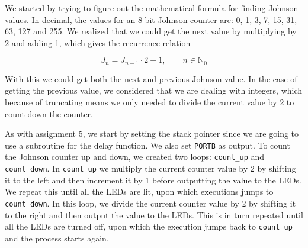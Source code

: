 We started by trying to figure out the mathematical formula for finding Johnson values. In decimal, the values for an 8-bit Johnson counter are: 0, 1, 3, 7, 15, 31, 63, 127 and 255. We realized that we could get the next value by multiplying by 2 and adding 1, which gives the recurrence relation

\begin{equation*}
    J_n = J_{n-1} \cdot 2 + 1, \qquad n \in \mathbb{N}_0
\end{equation*}

With this we could get both the next and previous Johnson value. In the case of getting the previous value, we considered that we are dealing with integers, which because of truncating means we only needed to divide the current value by 2 to count down the counter.

As with assignment 5, we start by setting the stack pointer since we are going to use a subroutine for the delay function. We also set \texttt{PORTB} as output. To count the Johnson counter up and down, we created two loops: \texttt{count\_up} and \texttt{count\_down}. In \texttt{count\_up} we multiply the current counter value by 2 by shifting it to the left and then increment it by 1 before outputting the value to the LEDs. We repeat this until all the LEDs are lit, upon which executions jumps to \texttt{count\_down}. In this loop, we divide the current counter value by 2 by shifting it to the right and then output the value to the LEDs. This is in turn repeated until all the LEDs are turned off, upon which the execution jumps back to \texttt{count\_up} and the process starts again.
